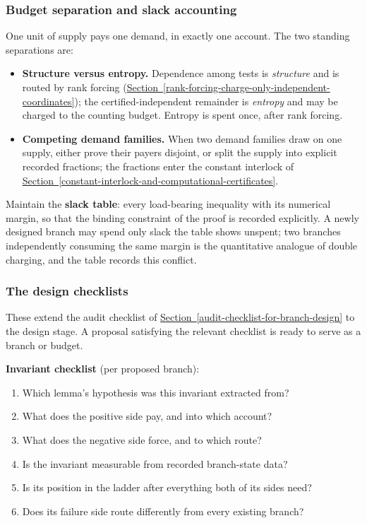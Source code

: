 \documentclass[
  11pt,
]{article}
\providecommand{\tightlist}{%
  \setlength{\itemsep}{0pt}\setlength{\parskip}{0pt}}
\theoremstyle{definition}
\newcommand{\secref}[1]{\hyperref[#1]{Section~\ref*{#1}}}
\begin{document}
\subsubsection{Budget separation and slack
accounting}\label{budget-separation-and-slack-accounting}

One unit of supply pays one demand, in exactly one account. The two
standing separations are:

\begin{itemize}
\tightlist
\item
  \textbf{Structure versus entropy.} Dependence among tests is
  \emph{structure} and is routed by rank forcing (\secref{rank-forcing-charge-only-independent-coordinates}); the
  certified-independent remainder is \emph{entropy} and may be charged
  to the counting budget. Entropy is spent once, after rank forcing.
\item
  \textbf{Competing demand families.} When two demand families draw on
  one supply, either prove their payers disjoint, or split the supply
  into explicit recorded fractions; the fractions enter the constant
  interlock of \secref{constant-interlock-and-computational-certificates}.
\end{itemize}

Maintain the \textbf{slack table}: every load-bearing inequality with
its numerical margin, so that the binding constraint of the proof is
recorded explicitly. A newly designed branch may spend only slack the
table shows unspent; two branches independently consuming the same
margin is the quantitative analogue of double charging, and the table
records this conflict.



\subsubsection{The design checklists}\label{the-design-checklists}

These extend the audit checklist of \secref{audit-checklist-for-branch-design} to the design stage. A
proposal satisfying the relevant checklist is ready to serve as a branch
or budget.

\textbf{Invariant checklist} (per proposed branch):

\begin{enumerate}
\def\labelenumi{\arabic{enumi}.}
\tightlist
\item
  Which lemma's hypothesis was this invariant extracted from?
\item
  What does the positive side pay, and into which account?
\item
  What does the negative side force, and to which route?
\item
  Is the invariant measurable from recorded branch-state data?
\item
  Is its position in the ladder after everything both of its sides need?
\item
  Does its failure side route differently from every existing branch?
\end{enumerate}
\end{document}
